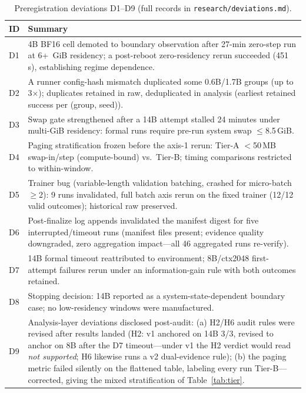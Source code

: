 \documentclass[10pt,twocolumn]{article}
\begin{document}
\begin{table}[h]\centering
\caption{Preregistration deviations D1--D9 (full records in
\texttt{research/deviations.md}).}
\footnotesize\setlength{\tabcolsep}{3pt}
\begin{tabular}{@{}p{0.8cm}p{7.6cm}@{}}
\toprule
ID & Summary\\
\midrule
D1 & 4B BF16 cell demoted to boundary observation after 27-min
zero-step run at 6+~GiB residency; a post-reboot zero-residency rerun
succeeded (451\,s), establishing regime dependence.\\
D2 & A runner config-hash mismatch duplicated some 0.6B/1.7B groups
(up to 3$\times$); duplicates retained in raw, deduplicated in
analysis (earliest retained success per (group, seed)).\\
D3 & Swap gate strengthened after a 14B attempt stalled 24 minutes
under multi-GiB residency: formal runs require pre-run system swap
$\le$8.5\,GiB.\\
D4 & Paging stratification frozen before the axis-1 rerun:
Tier-A $<$50\,MB swap-in/step (compute-bound) vs.\ Tier-B; timing
comparisons restricted to within-window.\\
D5 & Trainer bug (variable-length validation batching, crashed for
micro-batch $\ge$2): 9 runs invalidated, full batch axis rerun on the
fixed trainer (12/12 valid outcomes); historical raw preserved.\\
D6 & Post-finalize log appends invalidated the manifest digest for
five interrupted/timeout runs (manifest files present; evidence
quality downgraded, zero aggregation impact---all 46 aggregated runs
re-verify).\\
D7 & 14B formal timeout reattributed to environment; 8B/ctx2048
first-attempt failures rerun under an information-gain rule with both
outcomes retained.\\
D8 & Stopping decision: 14B reported as a system-state-dependent
boundary case; no low-residency windows were manufactured.\\
D9 & Analysis-layer deviations disclosed post-audit: (a) H2/H6
audit rules were revised after results landed (H2: v1 anchored on 14B
3/3, revised to anchor on 8B after the D7 timeout---under v1 the H2
verdict would read \emph{not supported}; H6 likewise runs a v2
dual-evidence rule); (b) the paging
metric failed silently on the flattened table, labeling every run
Tier-B---corrected, giving the mixed stratification of
Table~\ref{tab:tier}.\\
\bottomrule
\end{tabular}
\end{table}
\end{document}
